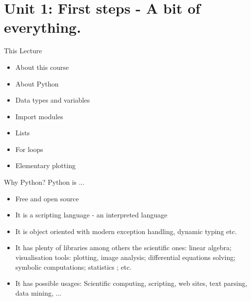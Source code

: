 \documentclass[hyperref={pdfpagelabels=false},table, handout]{beamer}
\begin{document}
\part{Unit 1: First steps - A bit of everything.}

\begin{frame}{This Lecture}

  \begin{itemize}
    \item About this course
    \item About Python
    \item Data types and variables
    \item Import modules
    \item Lists
    \item For loops
    \item Elementary plotting
  \end{itemize}
\end{frame}

\begin{frame}{Why Python?}
Python is ...
\begin{itemize}
\item Free and open source
\item It is a \alert{scripting language} - an interpreted  language
\item It is object oriented with modern exception handling, dynamic typing etc.
\item It has plenty of libraries among others the scientific ones:
\small linear algebra;  visualisation tools: plotting, image analysis; differential equations solving; symbolic computations; statistics
; etc.
\item It has possible usages: \small
Scientific computing, scripting, web sites, text parsing, data mining, ...
\end{itemize}
\end{frame}
\end{document}
